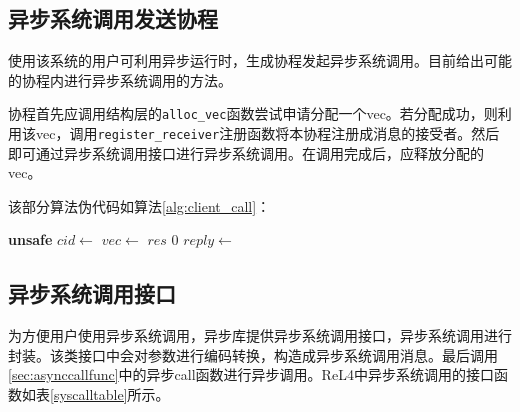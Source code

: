 \subsection{异步系统调用发送协程}

使用该系统的用户可利用异步运行时，生成协程发起异步系统调用。目前给出可能的协程内进行异步系统调用的方法。

协程首先应调用结构层的\texttt{alloc\_vec}函数尝试申请分配一个vec。若分配成功，则利用该vec，调用\texttt{register\_receiver}注册函数将本协程注册成消息的接受者。然后即可通过异步系统调用接口进行异步系统调用。在调用完成后，应释放分配的vec。

该部分算法伪代码如算法\ref{alg:client_call}：

\begin{algorithm}
  \caption{客户端异步系统调用请求}\label{alg:client_call}
  \begin{algorithmic}
    \State \textbf{unsafe}
    \State $cid \gets$ 
    \State $vec \gets$
    \State {}
    \State $res$
    \Else
    \State $0$
    \EndIf
    \State $reply \gets$  
    \State {}
    \Else
    \State {}
    \EndIf
    \EndFor
    \State {}
    \EndProcedure
  \end{algorithmic}
\end{algorithm}


\subsection{异步系统调用接口}

为方便用户使用异步系统调用，异步库提供异步系统调用接口，异步系统调用进行封装。该类接口中会对参数进行编码转换，构造成异步系统调用消息。最后调用\ref{sec:asynccallfunc}中的异步call函数进行异步调用。ReL4中异步系统调用的接口函数如表\ref{syscalltable}所示。

